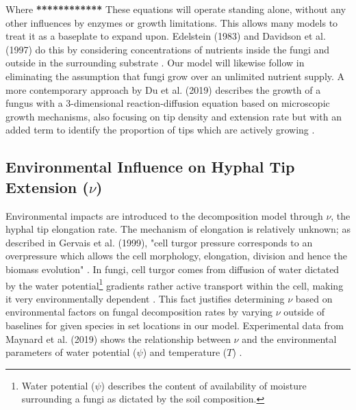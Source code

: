 \documentclass[12pt]{article}
\begin{document}
\begin{multicols}{2}
Where \textbf{************} These equations will operate standing alone, without any other influences by enzymes or growth limitations. This allows many models to treat it as a baseplate to expand upon. Edelstein (1983) and Davidson et al. (1997) do this by considering concentrations of nutrients inside the fungi and outside in the surrounding substrate \cite{Edelstein1983, Davidson2012}. Our model will likewise follow in eliminating the assumption that fungi grow over an unlimited nutrient supply. A more contemporary approach by Du et al. (2019) describes the growth of a fungus with a 3-dimensional reaction-diffusion equation based on microscopic growth mechanisms, also focusing on tip density and extension rate but with an added term to identify the proportion of tips which are actively growing \cite{Du2019}.

\subsection{Environmental Influence on Hyphal Tip Extension ($\nu$)}
Environmental impacts are introduced to the decomposition model through $\nu$, the hyphal tip elongation rate. The mechanism of elongation is relatively unknown; as described in Gervais et al. (1999), "cell turgor pressure corresponds to an overpressure which allows the cell morphology, elongation, division and hence the biomass evolution" \cite{Gervais1999, Steinberg2007}. In fungi, cell turgor comes from diffusion of water dictated by the water potential\footnote{Water potential ($\psi$) describes the content of availability of moisture surrounding a fungi as dictated by the soil composition.} gradients rather active transport within the cell, making it very environmentally dependent \cite{Gervais1999}. This fact justifies determining $\nu$ based on environmental factors on fungal decomposition rates by varying $\nu$ outside of baselines for given species in set locations in our model. Experimental data from Maynard et al. (2019) shows the relationship between $\nu$ and the environmental parameters of water potential ($\psi$) and temperature ($T$) \cite{Maynard2019}.


\end{multicols}
\end{document}

